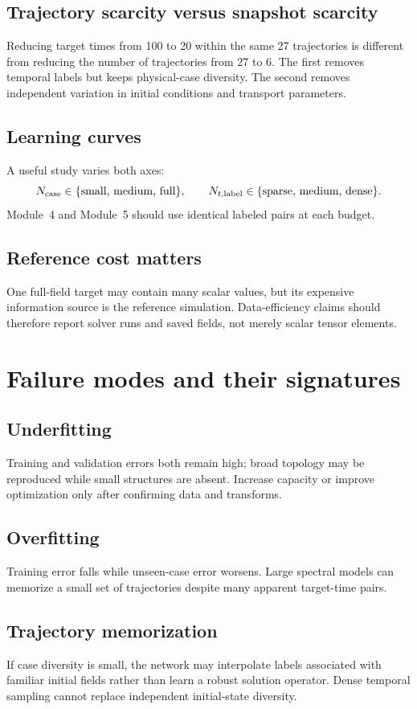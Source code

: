 \documentclass[11pt]{article}
\begin{document}
\subsection{Trajectory scarcity versus snapshot scarcity}
Reducing target times from 100 to 20 within the same 27 trajectories is different from reducing the number of trajectories from 27 to 6. The first removes temporal labels but keeps physical-case diversity. The second removes independent variation in initial conditions and transport parameters.

\subsection{Learning curves}
A useful study varies both axes:
\[
N_{\rm case}\in\{\text{small, medium, full}\},
\qquad
N_{t,\rm label}\in\{\text{sparse, medium, dense}\}.
\]
Module~4 and Module~5 should use identical labeled pairs at each budget.

\subsection{Reference cost matters}
One full-field target may contain many scalar values, but its expensive information source is the reference simulation. Data-efficiency claims should therefore report solver runs and saved fields, not merely scalar tensor elements.

\section{Failure modes and their signatures}
\label{sec:failures}

\subsection{Underfitting}
Training and validation errors both remain high; broad topology may be reproduced while small structures are absent. Increase capacity or improve optimization only after confirming data and transforms.

\subsection{Overfitting}
Training error falls while unseen-case error worsens. Large spectral models can memorize a small set of trajectories despite many apparent target-time pairs.

\subsection{Trajectory memorization}
If case diversity is small, the network may interpolate labels associated with familiar initial fields rather than learn a robust solution operator. Dense temporal sampling cannot replace independent initial-state diversity.
\end{document}
